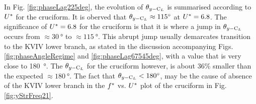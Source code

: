 \documentclass[oneside]{utmthesis}
\begin{document}
In Fig. \ref{fig:phaseLag225deg}, the evolution of $\theta_{y-\text{C}_{L}}$ is summarised according to $U^{*}$ for the \angtw{} cruciform. It is oberved that $\plag \approx \SI{115}{\degree}$ at $U^{*} = 6.8$. The significance of $U^{*} = 6.8$ for the \angtw{} cruciform is that it is where a jump in $\theta_{y-\text{C}_{L}}$ occurs from $\approx \SI{30}{\degree}$ to $\approx \SI{115}{\degree}$. This abrupt jump usually demarcates transition to the KVIV lower branch, as stated in the discussion accompanying Figs. \ref{fig:phaseAngleRegime} and \ref{fig:phaseLag67545deg}, with a value that is very close to \SI{180}{\degree}. The $\theta_{y-\text{C}_{L}}$ for the \angtw{} cruciform however, is about 36\% smaller than the expected $\approx \SI{180}{\degree}$. The fact that $\plag < 180 \si{\degree}$, may be the cause of absence of the KVIV lower branch in the $f^{*}$ vs. $U^{*}$ plot of the \angtw{} cruciform in Fig. \ref{fig:yStrFreq21}.
\end{document}
